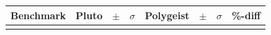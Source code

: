 \documentclass[sigplan]{acmart}
\newcommand{\tool}{Polygeist\xspace}
\begin{document}
\begin{table}
{
\footnotesize
\begin{center}
\begin{tabular}{p{1.2cm}rp{0.08cm}rrp{0.08cm}rr}
    \toprule
Benchmark   & Pluto &$\pm$&$\sigma$   & \tool &$\pm$&$\sigma$ & \%-diff  \\ \midrule\rowcolor{aluminium1}


\end{tabular}
\end{center}}
\end{table}
\end{document}
